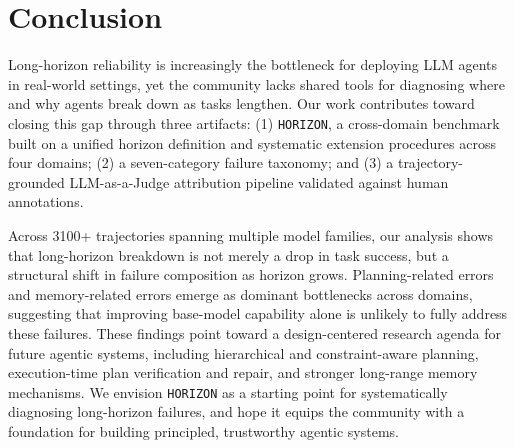 \documentclass[11pt]{article}
\begin{document}
\section{Conclusion}
Long-horizon reliability is increasingly the bottleneck for deploying LLM agents in real-world settings, yet the community lacks shared tools for diagnosing where and why agents break down as tasks lengthen. Our work contributes toward closing this gap through three artifacts: (1) \texttt{HORIZON}, a cross-domain benchmark built on a unified horizon definition and systematic extension procedures across four domains; (2) a seven-category failure taxonomy; and (3) a trajectory-grounded LLM-as-a-Judge attribution pipeline validated against human annotations. 

Across 3100+ trajectories spanning multiple model families, our analysis shows that long-horizon breakdown is not merely a drop in task success, but a structural shift in failure composition as horizon grows. Planning-related errors and memory-related errors emerge as dominant bottlenecks across domains, suggesting that improving base-model capability alone is unlikely to fully address these failures. 
These findings point toward a design-centered research agenda for future agentic systems, including hierarchical and constraint-aware planning, execution-time plan verification and repair, and stronger long-range memory mechanisms. 
We envision \texttt{HORIZON} as a starting point for systematically diagnosing long-horizon failures, and hope it equips the community with a foundation for building principled, trustworthy agentic systems.


\end{document}
